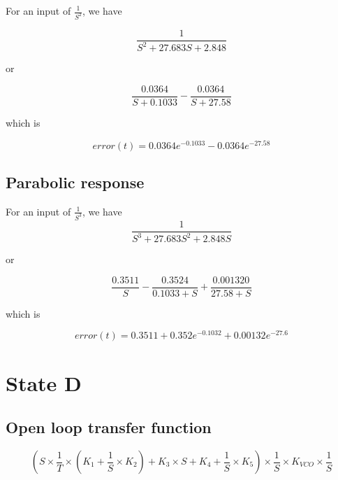 For an input of $\frac{1}{S^2}$, we have 

\begin{equation}
\frac{1}{S^2 + 27.683 S + 2.848}
\end{equation}

or 

\begin{equation}
\frac{0.0364}{S+0.1033} -\frac{0.0364}{S+27.58}
\end{equation}

which is 

\begin{equation}
error(t) =  0.0364e^{-0.1033} - 0.0364e^{-27.58}
\end{equation}


\subsection{Parabolic response}

For an input of $\frac{1}{S^3}$, we have 
\begin{equation}
\frac{1}{S^3 +27.683 S^2 + 2.848 S}
\end{equation}


or 

\begin{equation}
\frac{0.3511}{S}-\frac{0.3524}{0.1033+S}
+\frac{0.001320}{27.58+S}
\end{equation}

which is

\begin{equation}
error(t) = 0.3511 + 0.352 e^{-0.1032} + 0.00132 e^{-27.6}
\end{equation}

\section{State D}




\subsection{Open loop transfer function}
\begin{comment}
(18, 1)
(1, array([ 0.        ,  0.01131368,  0.00022784]))
(18, 1)
(2, array([ 55.06692161,   4.63278117,   0.77306969]))
\end{comment}

\begin{equation}
(S \times \frac{1}{T} \times (K_1 + \frac{1}{S} \times K_2) + K_3 \times S + K_4 + \frac{1}{S} \times K_5) \times \frac{1}{S} \times K_{VCO} \times \frac{1}{S}
\end{equation}

